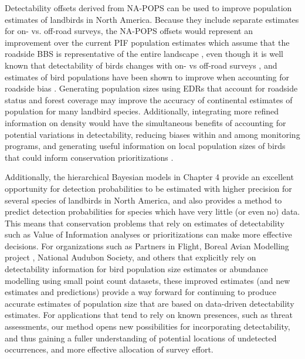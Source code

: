 \par Detectability offsets derived from NA-POPS can be used to improve population estimates of landbirds in North America. 
Because they include separate estimates for on- vs. off-road surveys, the NA-POPS offsets would represent an improvement over the current PIF population estimates which assume that the roadside BBS is representative of the entire landscape \citep{rosenberg_partners_2016, stanton_estimating_2019}, even though it is well known that detectability of birds changes with on- vs off-road surveys \citep{sauer_first_2017, yip_sound_2017, cooke_road_2020}, and estimates of bird populations have been shown to improve when accounting for roadside bias \citep{solymos_lessons_2020}. 
Generating population sizes using EDRs that account for roadside status and forest coverage may improve the accuracy of continental estimates of population for many landbird species. 
Additionally, integrating more refined information on density would have the simultaneous benefits of accounting for potential variations in detectability, reducing biases within and among monitoring programs, and generating useful information on local population sizes of birds that could inform conservation prioritizations \citep{veloz_improving_2015}.

Additionally, the hierarchical Bayesian models in Chapter 4 provide an excellent opportunity for detection probabilities to be estimated with higher precision for several species of landbirds in North America, and also provides a method to predict detection probabilities for species which have very little (or even no) data. 
This means that conservation problems that rely on estimates of detectability such as Value of Information analyses \citep{canessa_when_2015, bennett_when_2018} or prioritizations \citep{hanson_prioritizr_2022} can make more effective decisions.
For organizations such as Partners in Flight, Boreal Avian Modelling project \citep{cumming_toward_2010}, National Audubon Society, and others that explicitly rely on detectability information for bird population size estimates or abundance modelling using small point count datasets, these improved estimates (and new estimates and predictions) provide a way forward for continuing to produce accurate estimates of population size that are based on data-driven detectability estimates.
For applications that tend to rely on known presences, such as threat assessments, our method opens new possibilities for incorporating detectability, and thus gaining a fuller understanding of  potential locations of undetected occurrences, and more effective allocation of survey effort.

